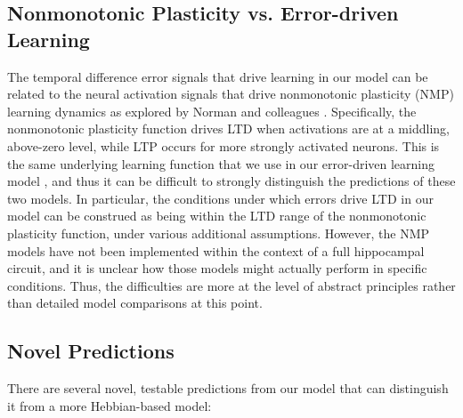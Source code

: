 \documentclass[11pt,twoside]{article}
\newif\myifpdf
\begin{document}
\subsection{Nonmonotonic Plasticity vs. Error-driven Learning}

The temporal difference error signals that drive learning in our model can be related to the neural activation signals that drive nonmonotonic plasticity (NMP) learning dynamics as explored by Norman and colleagues \citep{RitvoTurk-BrowneNorman19}.  Specifically, the nonmonotonic plasticity function drives LTD when activations are at a middling, above-zero level, while LTP occurs for more strongly activated neurons.  This is the same underlying learning function that we use in our error-driven learning model \citep{OReillyMunakataFrankEtAl12}, and thus it can be difficult to strongly distinguish the predictions of these two models.  In particular, the conditions under which errors drive LTD in our model can be construed as being within the LTD range of the nonmonotonic plasticity function, under various additional assumptions.  However, the NMP models have not been implemented within the context of a full hippocampal circuit, and it is unclear how those models might actually perform in specific conditions.  Thus, the difficulties are more at the level of abstract principles rather than detailed model comparisons at this point.

\subsection{Novel Predictions}

There are several novel, testable predictions from our model that can distinguish it from a more Hebbian-based model:
\end{document}
